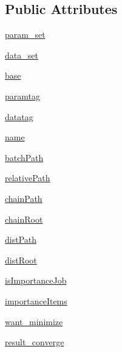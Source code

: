 \subsection*{Public Attributes}
\begin{DoxyCompactItemize}
\item 
\mbox{\hyperlink{classparamgrid_1_1batchjob_1_1jobItem_a2c53c09570ba09bba3b18313e832100d}{param\+\_\+set}}
\item 
\mbox{\hyperlink{classparamgrid_1_1batchjob_1_1jobItem_aa2bda614aa70f79336a2704f0b806cef}{data\+\_\+set}}
\item 
\mbox{\hyperlink{classparamgrid_1_1batchjob_1_1jobItem_af453f4de88c699dffaaca5bbff071035}{base}}
\item 
\mbox{\hyperlink{classparamgrid_1_1batchjob_1_1jobItem_ae287703cab58208f9104f1bc068f0a01}{paramtag}}
\item 
\mbox{\hyperlink{classparamgrid_1_1batchjob_1_1jobItem_a9a929b39633d20169047f6244326ef61}{datatag}}
\item 
\mbox{\hyperlink{classparamgrid_1_1batchjob_1_1jobItem_ab747468d6fae17c7bc300b882f9ddc8a}{name}}
\item 
\mbox{\hyperlink{classparamgrid_1_1batchjob_1_1jobItem_a7d2965e9c49f995aad9788c68200eaa7}{batch\+Path}}
\item 
\mbox{\hyperlink{classparamgrid_1_1batchjob_1_1jobItem_a46881718d47750804eb58698c84dd2b8}{relative\+Path}}
\item 
\mbox{\hyperlink{classparamgrid_1_1batchjob_1_1jobItem_a46e2753d8b1c86c0c2fa49874f673564}{chain\+Path}}
\item 
\mbox{\hyperlink{classparamgrid_1_1batchjob_1_1jobItem_ada67490ca63eb730804f3e895e66babc}{chain\+Root}}
\item 
\mbox{\hyperlink{classparamgrid_1_1batchjob_1_1jobItem_a389b7a88bde632e624441e0c6ed23a3a}{dist\+Path}}
\item 
\mbox{\hyperlink{classparamgrid_1_1batchjob_1_1jobItem_a5716b4ea8ba7d7be2807b57d2820bc26}{dist\+Root}}
\item 
\mbox{\hyperlink{classparamgrid_1_1batchjob_1_1jobItem_a329fd413aa26d42d9217f64ab7e4cf7e}{is\+Importance\+Job}}
\item 
\mbox{\hyperlink{classparamgrid_1_1batchjob_1_1jobItem_a4ed9a9f17aba613f34469f3751f6617b}{importance\+Items}}
\item 
\mbox{\hyperlink{classparamgrid_1_1batchjob_1_1jobItem_ac4da89c2ae5159e8b5a9d89e654a4adf}{want\+\_\+minimize}}
\item 
\mbox{\hyperlink{classparamgrid_1_1batchjob_1_1jobItem_a9136129d37eb747c5b449b79ab183ca1}{result\+\_\+converge}}

\end{DoxyCompactItemize}

